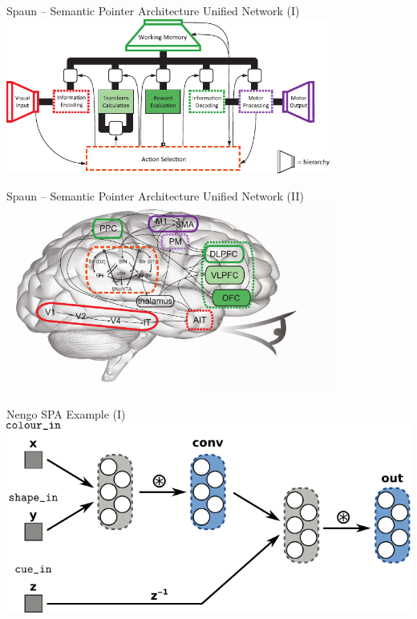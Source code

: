 \documentclass[handout,aspectratio=169]{beamer}
\begin{document}
	\begin{frame}{Spaun -- Semantic Pointer Architecture Unified Network (I)}
		\centering
		\includegraphics[width=0.8\textwidth]{media/eliasmith_2012_spaun_architecture.pdf}
	\end{frame}
	
	\begin{frame}{Spaun -- Semantic Pointer Architecture Unified Network (II)}
		\centering
		\includegraphics[width=0.8\textwidth]{media/eliasmith_2012_spaun_anatomy.pdf}
	\end{frame}

	\begin{frame}{Nengo SPA Example (I)}
		\centering
		\includegraphics[width=\textwidth]{media/spa_network.pdf}
	\end{frame}
\end{document}
